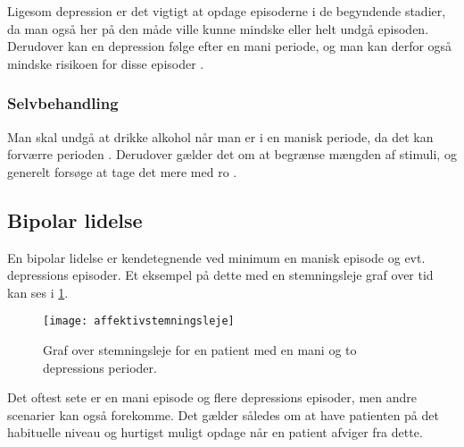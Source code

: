 Ligesom depression er det vigtigt at opdage episoderne i de begyndende stadier, da man også her på den måde ville kunne mindske eller helt undgå episoden.
Derudover kan en depression følge efter en mani periode, og man kan derfor også mindske risikoen for disse episoder \citep{misc:bipolarsundhed}.

\subsubsection{Selvbehandling}
Man skal undgå at drikke alkohol når man er i en manisk periode, da det kan forværre perioden \citep{misc:netpsykmani}.
Derudover gælder det om at begrænse mængden af stimuli, og generelt forsøge at tage det mere med ro \citep{misc:janne-rasmussen}.

\subsection{Bipolar lidelse}
En bipolar lidelse er kendetegnende ved minimum en manisk episode og evt. depressions episoder.
Et eksempel på dette med en stemningsleje graf over tid kan ses i \cref{fig:stemningslejegrafeksempel}.

\begin{figure}
	\centering
	\texttt{[image: affektivstemningsleje]}
	\caption{Graf over stemningsleje for en patient med en mani og to depressions perioder.}\label{fig:stemningslejegrafeksempel}
\end{figure}

Det oftest sete er en mani episode og flere depressions episoder, men andre scenarier kan også forekomme.
Det gælder således om at have patienten på det habituelle niveau og hurtigst muligt opdage når en patient afviger fra dette.